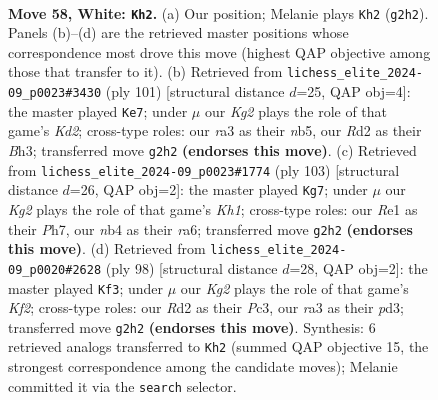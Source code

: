 \documentclass[11pt]{article}
\begin{document}
\clearpage

\begin{figure}[p]\centering
\begin{subfigure}{0.46\textwidth}\centering
\resizebox{\linewidth}{!}{%
\newchessgame
\chessboard[
  setfen={1k6/1p5p/6pP/p4p2/1n3P2/r7/3R2K1/4R3 w - - 3 58},
  showmover=false,
  pgfstyle=straightmove, color=movearrow, markmove={g2-h2}
]}
\caption{}
\end{subfigure}\hfill
\begin{subfigure}{0.46\textwidth}\centering
\resizebox{\linewidth}{!}{%
\newchessgame
\chessboard[
  setfen={1r6/3k4/1p6/pN6/P7/1P5b/1KP2R2/8 b - - 18 51},
  showmover=false,
  pgfstyle=straightmove, color=movearrow, markmove={d7-e7}
]}
\caption{}
\end{subfigure}
\\[4pt]
\begin{subfigure}{0.46\textwidth}\centering
\resizebox{\linewidth}{!}{%
\newchessgame
\chessboard[
  setfen={5r1k/7p/R7/P2Ppp2/1P6/5P1P/6P1/7K b - - 0 52},
  showmover=false,
  pgfstyle=straightmove, color=movearrow, markmove={h8-g7}
]}
\caption{}
\end{subfigure}\hfill
\begin{subfigure}{0.46\textwidth}\centering
\resizebox{\linewidth}{!}{%
\newchessgame
\chessboard[
  setfen={8/4r3/3k4/3p4/2p2PP1/1pPp4/1P3K2/1R6 w - - 1 50},
  showmover=false,
  pgfstyle=straightmove, color=movearrow, markmove={f2-f3}
]}
\caption{}
\end{subfigure}
\caption{\textbf{Move 58, White: \texttt{Kh2}.} (a) Our position; Melanie plays \texttt{Kh2} (\texttt{g2h2}). Panels (b)--(d) are the retrieved master positions whose correspondence most drove this move (highest QAP objective among those that transfer to it). (b) Retrieved from \texttt{lichess\_elite\_2024-09\_p0023\#3430} (ply 101) [structural distance $d$=25, QAP obj=4]: the master played \texttt{Ke7}; under $\mu$ our \emph{Kg2} plays the role of that game's \emph{Kd2}; cross-type roles: our \emph{r}a3 as their \emph{n}b5, our \emph{R}d2 as their \emph{B}h3; transferred move \texttt{g2h2} \textbf{(endorses this move)}. (c) Retrieved from \texttt{lichess\_elite\_2024-09\_p0023\#1774} (ply 103) [structural distance $d$=26, QAP obj=2]: the master played \texttt{Kg7}; under $\mu$ our \emph{Kg2} plays the role of that game's \emph{Kh1}; cross-type roles: our \emph{R}e1 as their \emph{P}h7, our \emph{n}b4 as their \emph{r}a6; transferred move \texttt{g2h2} \textbf{(endorses this move)}. (d) Retrieved from \texttt{lichess\_elite\_2024-09\_p0020\#2628} (ply 98) [structural distance $d$=28, QAP obj=2]: the master played \texttt{Kf3}; under $\mu$ our \emph{Kg2} plays the role of that game's \emph{Kf2}; cross-type roles: our \emph{R}d2 as their \emph{P}c3, our \emph{r}a3 as their \emph{p}d3; transferred move \texttt{g2h2} \textbf{(endorses this move)}. Synthesis: 6 retrieved analogs transferred to \texttt{Kh2} (summed QAP objective 15, the strongest correspondence among the candidate moves); Melanie committed it via the \texttt{search} selector.}
\label{fig:thought-m114}
\end{figure}
\end{document}
